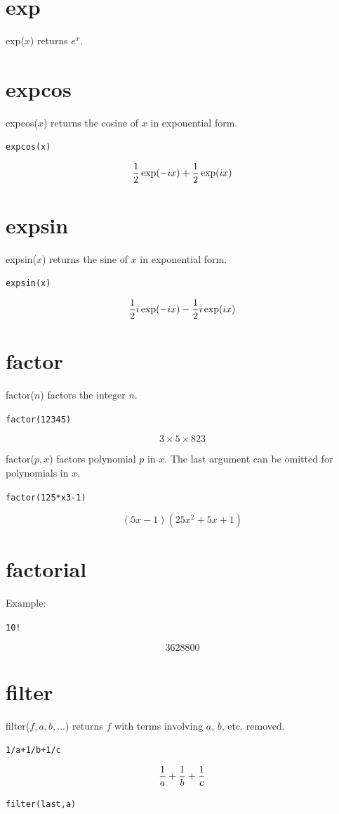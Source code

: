 \documentclass[12pt]{book}
\begin{document}
\section*{exp}
exp($x$) returns $e^x$.

\section*{expcos}
expcos($x$) returns the cosine of $x$ in exponential form.

\medskip
{\tt expcos(x)}

$${1\over2}\exp(-ix)+{1\over2}\exp(ix)$$

\section*{expsin}
expsin($x$) returns the sine of $x$ in exponential form.

\medskip
{\tt expsin(x)}

$${1\over2}i\exp(-ix)-{1\over2}i\exp(ix)$$

\section*{factor}
factor($n$) factors the integer $n$.

\medskip
{\tt factor(12345)}

$$3\times 5\times 823$$

\medskip
\noindent
factor($p,x$) factors polynomial $p$ in $x$.
The last argument can be omitted for polynomials in $x$.

\medskip
{\tt factor(125*x{}3-1)}

$$(5x-1)(25x^2+5x+1)$$

\section*{factorial}
Example:

\medskip
{\tt 10!}

$$3628800$$

\section*{filter}
filter($f,a,b,\ldots$) returns $f$ with terms involving $a$, $b$, etc. removed.

\medskip
{\tt 1/a+1/b+1/c}

$${1\over a}+{1\over b}+{1\over c}$$

{\tt filter(last,a)}
\end{document}
